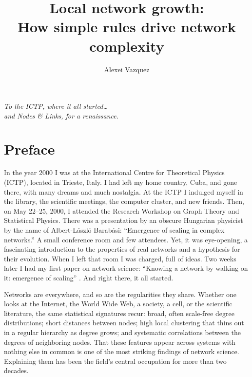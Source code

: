 \documentclass[10pt]{book}
\begin{document}
\title{Local network growth:\\How simple rules drive network complexity}

\author{Alexei Vazquez}
\maketitle

\thispagestyle{empty}
\vspace*{\fill}
\begin{center}
{\itshape To the ICTP, where it all started\ldots\\[0.7em]
and Nodes \& Links, for a renaissance.}
\end{center}
\vspace*{\fill}
\clearpage

\chapter*{Preface}

In the year 2000 I was at the International Centre for Theoretical Physics 
(ICTP), located in Trieste, Italy. I had left my home country, Cuba, and gone 
there, with many dreams and much nostalgia. At the ICTP I indulged myself in 
the library, the scientific meetings, the computer cluster, and new friends. 
Then, on May 22--25, 2000, I attended the Research Workshop on Graph Theory 
and Statistical Physics. There was a presentation by an obscure Hungarian 
physicist by the name of Albert-L\'aszl\'o Barab\'asi: ``Emergence of scaling 
in complex networks.'' A small conference room and few attendees. Yet, it was 
eye-opening, a fascinating introduction to the properties of real networks 
and a hypothesis for their evolution. When I left that room I was charged, 
full of ideas. Two weeks later I had my first paper on network science: 
``Knowing a network by walking on it: emergence of scaling'' 
\citep{vazquez2000walk}. And right there, it all started.

Networks are everywhere, and so are the regularities they share. Whether one
looks at the Internet, the World Wide Web, a society, a cell, or the scientific
literature, the same statistical signatures recur: broad, often scale-free
degree distributions; short distances between nodes; high local clustering that
thins out in a regular hierarchy as degree grows; and systematic correlations
between the degrees of neighboring nodes. That these features appear across
systems with nothing else in common is one of the most striking findings of
network science. Explaining them has been the field's central occupation for
more than two decades.
\end{document}

